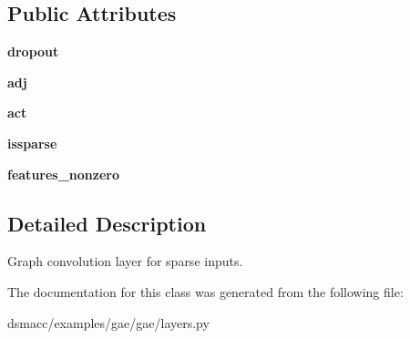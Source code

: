 \subsection*{Public Attributes}
\begin{DoxyCompactItemize}
\item 
\mbox{\label{classgae_1_1layers_1_1GraphConvolutionSparse_ac3ebc6998b97a84926534a157e4fdfc6}} 
{\bfseries dropout}
\item 
\mbox{\label{classgae_1_1layers_1_1GraphConvolutionSparse_ac5ec39afd01edbd01dd68de472d680c5}} 
{\bfseries adj}
\item 
\mbox{\label{classgae_1_1layers_1_1GraphConvolutionSparse_ade2af9eabfb5452e1c3ee5172990d7b9}} 
{\bfseries act}
\item 
\mbox{\label{classgae_1_1layers_1_1GraphConvolutionSparse_a77e54cd69c9beb227098589ed16edb5d}} 
{\bfseries issparse}
\item 
\mbox{\label{classgae_1_1layers_1_1GraphConvolutionSparse_a3c8ee47f1dd21c70f31b00b94ef2c443}} 
{\bfseries features\+\_\+nonzero}
\end{DoxyCompactItemize}


\subsection{Detailed Description}
\begin{DoxyVerb}Graph convolution layer for sparse inputs.\end{DoxyVerb}
 

The documentation for this class was generated from the following file\+:\begin{DoxyCompactItemize}
\item 
dsmacc/examples/gae/gae/layers.\+py\end{DoxyCompactItemize}
